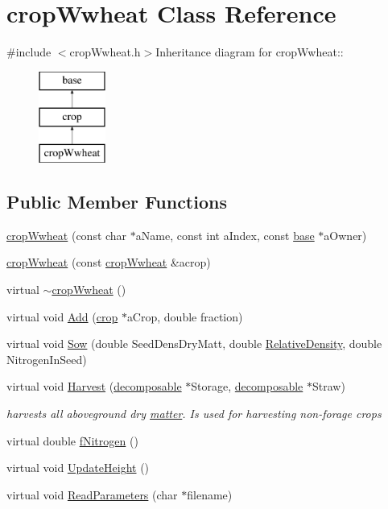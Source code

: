 \hypertarget{classcrop_wwheat}{
\section{cropWwheat Class Reference}
\label{classcrop_wwheat}
}


{\ttfamily \#include $<$cropWwheat.h$>$}Inheritance diagram for cropWwheat::\begin{figure}[H]
\begin{center}
\leavevmode
\includegraphics[height=3cm]{classcrop_wwheat}
\end{center}
\end{figure}
\subsection*{Public Member Functions}
\begin{DoxyCompactItemize}
\item 
\hyperlink{classcrop_wwheat_a83736b84f650615fe4e66da97b4950bb}{cropWwheat} (const char $\ast$aName, const int aIndex, const \hyperlink{classbase}{base} $\ast$aOwner)
\item 
\hyperlink{classcrop_wwheat_af5d47f47e4bde1b3b698ec33a5c84c80}{cropWwheat} (const \hyperlink{classcrop_wwheat}{cropWwheat} \&acrop)
\item 
virtual \hyperlink{classcrop_wwheat_aa04ebb606ceec1418bbeaedebea19a5e}{$\sim$cropWwheat} ()
\item 
virtual void \hyperlink{classcrop_wwheat_a87f616dcc3aa36a34ac45eef667d6935}{Add} (\hyperlink{classcrop}{crop} $\ast$aCrop, double fraction)
\item 
virtual void \hyperlink{classcrop_wwheat_a48bc90182781fdf230087c37b372238d}{Sow} (double SeedDensDryMatt, double \hyperlink{classcrop_aa4666fdd11920e05003bfeefc5518ddf}{RelativeDensity}, double NitrogenInSeed)
\item 
virtual void \hyperlink{classcrop_wwheat_a846500070e461386ab5c309a9e6cd388}{Harvest} (\hyperlink{classdecomposable}{decomposable} $\ast$Storage, \hyperlink{classdecomposable}{decomposable} $\ast$Straw)
\begin{DoxyCompactList}\small\item\em harvests all aboveground dry \hyperlink{classmatter}{matter}. Is used for harvesting non-\/forage crops \item\end{DoxyCompactList}\item 
virtual double \hyperlink{classcrop_wwheat_aa4c7b3fd03506c8d3ca174bfc31d93e2}{fNitrogen} ()
\item 
virtual void \hyperlink{classcrop_wwheat_a42da6f7e2539c75a2171f2dae571257f}{UpdateHeight} ()
\item 
virtual void \hyperlink{classcrop_wwheat_ae2a9c67716b7722a45b86e83d41ca26f}{ReadParameters} (char $\ast$filename)
\end{DoxyCompactItemize}
